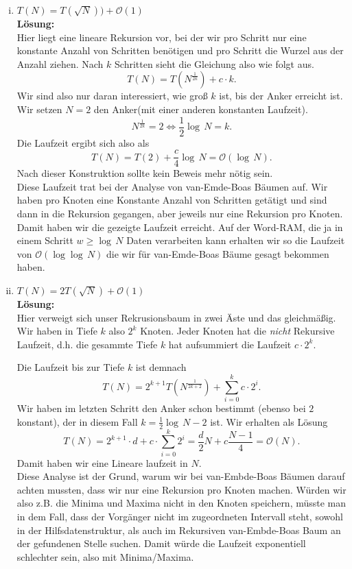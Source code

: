 \documentclass[11pt,a4paper,ngerman]{article}
\begin{document}
\begin{enumerate}[(i)]
	\item $T(N) = T(\sqrt{N})) + \mathcal{O}(1)$\\
	\noindent\textbf{Lösung:}\\
		Hier liegt eine lineare Rekursion vor, bei der wir pro Schritt nur eine konstante Anzahl von Schritten benötigen
		und pro Schritt die Wurzel aus der Anzahl ziehen. Nach $k$ Schritten sieht die Gleichung also wie folgt aus.
		$$
			T(N) = T(N^\frac{1}{2k}) + c \cdot k.
		$$
		Wir sind also nur daran interessiert, wie groß $k$ ist, bis der Anker erreicht ist. Wir setzen $N=2$ den Anker(mit
		einer anderen konstanten Laufzeit).
		$$
			N^\frac{1}{2k} = 2 \Leftrightarrow \frac{1}{2} \log \, N = k.
		$$
		Die Laufzeit ergibt sich also als
		$$
			T(N) = T(2) + \frac{c}{4} \log \, N = \mathcal{O}(\log \, N).
		$$
		Nach dieser Konstruktion sollte kein Beweis mehr nötig sein.\\

		Diese Laufzeit trat bei der Analyse von van-Emde-Boas Bäumen auf. Wir haben pro Knoten eine Konstante Anzahl von
		Schritten getätigt und sind dann in die Rekursion gegangen, aber jeweils nur eine Rekursion pro Knoten. Damit haben wir die
		gezeigte Laufzeit erreicht. Auf der Word-RAM, die ja in einem Schritt $w \geq \log \, N$ Daten verarbeiten kann erhalten wir so
		die Laufzeit von $\mathcal{O}(\log \log \, N)$ die wir für van-Emde-Boas Bäume gesagt bekommen haben.

	\item $T(N) = 2T(\sqrt{N}) + \mathcal{O}(1)$\\
	\noindent\textbf{Lösung:}\\
		Hier verweigt sich unser Rekrusionsbaum in zwei Äste und das gleichmäßig.
		Wir haben in Tiefe $k$ also $2^k$ Knoten. Jeder Knoten hat die \emph{nicht} Rekursive Laufzeit,
		d.h. die gesammte Tiefe $k$ hat aufsummiert die Laufzeit $c \cdot 2^k$.

		Die Laufzeit bis zur Tiefe $k$ ist demnach
		$$
			T(N) = 2^{k+1}T(N^\frac{1}{2k+2}) + \sum_{i=0}^kc \cdot 2^i.
		$$
		Wir haben im letzten Schritt den Anker schon bestimmt (ebenso bei $2$ konstant), 
		der in diesem Fall $k = \frac{1}{2} \log \, N - 2$ ist.
		Wir erhalten als Lösung
		$$
			T(N) = 2^{k+1} \cdot d + c \cdot \sum_{i=0}^k 2^i = \frac{d}{2} N + c \frac{N - 1}{4} = \mathcal{O}(N).
		$$
		Damit haben wir eine Lineare laufzeit in $N$.\\

		Diese Analyse ist der Grund, warum wir bei van-Embde-Boas Bäumen darauf achten mussten, dass wir nur eine
		Rekursion pro Knoten machen. Würden wir also z.B. die Minima und Maxima nicht in den Knoten speichern, müsste
		man in dem Fall, dass der Vorgänger nicht im zugeordneten Intervall steht, sowohl in der Hilfsdatenstruktur, als auch im
		Rekursiven van-Embde-Boas Baum an der gefundenen Stelle suchen. Damit würde die Laufzeit exponentiell schlechter
		sein, also mit Minima/Maxima.


\end{enumerate}
\end{document}
